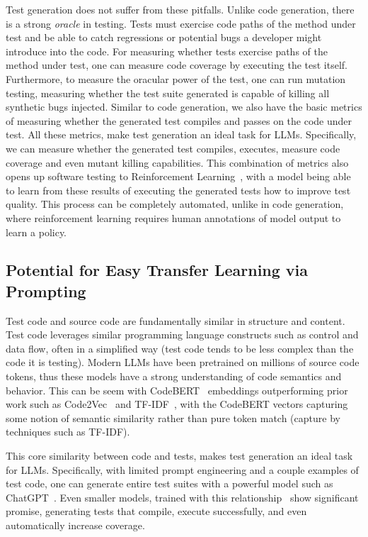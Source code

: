 \documentclass[sigconf,natbib=false]{acmart}
\begin{document}
Test generation does not suffer from these pitfalls. Unlike code generation, there is a strong \emph{oracle} in testing. Tests must exercise code 
paths of the method under test and be able to catch regressions or potential bugs a developer might introduce into the code. For measuring whether 
tests exercise paths of the method under test, one can measure code coverage by executing the test itself. Furthermore, to measure the oracular power 
of the test, one can run mutation testing, measuring whether the test suite generated is capable of killing all synthetic bugs injected. Similar to 
code generation, we also have the basic metrics of measuring whether the generated test compiles and passes on the code under test. All these metrics, 
make test generation an ideal task for LLMs. Specifically, we can measure whether the generated test compiles, executes, measure code coverage and 
even mutant killing capabilities. This combination of metrics also opens up software testing to Reinforcement Learning~\cite{rlhf},
with a model being able to learn from these results of executing the generated tests how to improve test quality. This process can be completely automated, 
unlike in code generation, where reinforcement learning requires human annotations of model output to learn a policy.

\subsection{Potential for Easy Transfer Learning via Prompting}

Test code and source code are fundamentally similar in structure and content. Test code leverages similar programming language 
constructs such as control and data flow, often in a simplified way (test code tends to be less complex than the code it is testing).
Modern LLMs have been pretrained on millions of source code tokens, thus these models have a strong understanding of code semantics 
and behavior. This can be seem with CodeBERT~\cite{codebert} embeddings outperforming prior work such as Code2Vec~\cite{code2vec} 
and TF-IDF~\cite{tfidf}, with the CodeBERT vectors capturing some notion of semantic similarity rather than pure token match (capture by techniques 
such as TF-IDF). 

This core similarity between code and tests, makes test generation an ideal task for LLMs. Specifically, with limited prompt engineering and 
a couple examples of test code, one can generate entire test suites with a powerful model such as ChatGPT~\cite{gpttestgen, siddiq2023empirical}. 
Even smaller models, trained with this relationship~\cite{catlm, starcoder} show significant promise, generating tests that compile, execute successfully, and 
even automatically increase coverage.
\end{document}
